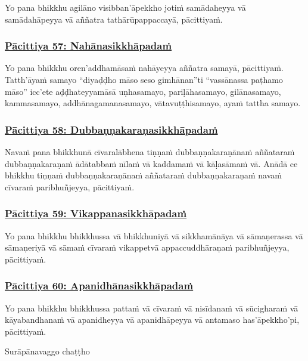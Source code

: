 Yo pana bhikkhu agilāno visibban'āpekkho jotiṁ samādaheyya vā samādahāpeyya vā aññatra tathārūpappaccayā, pācittiyaṁ.

\subsubsection*{\hyperref[exp57]{Pācittiya 57: Nahānasikkhāpadaṁ}}
\label{pac57}

Yo pana bhikkhu oren'addhamāsaṁ nahāyeyya aññatra samayā, pācittiyaṁ. Tatth'āyaṁ samayo “diyaḍḍho māso seso gimhānan''ti “vassānassa paṭhamo māso” icc'ete aḍḍhateyyamāsā uṇhasamayo, pariḷāhasamayo, gilānasamayo, kammasamayo, addhānagamanasamayo, vātavuṭṭhisamayo, ayaṁ tattha samayo.

\subsubsection*{\hyperref[exp58]{Pācittiya 58: Dubbaṇṇakaraṇasikkhāpadaṁ}}
\label{pac58}

Navaṁ pana bhikkhunā cīvaralābhena tiṇṇaṁ dubbaṇṇakaraṇānaṁ aññataraṁ dubbaṇṇakaraṇaṁ ādātabbaṁ nīlaṁ vā kaddamaṁ vā kāḷasāmaṁ vā. Anādā ce bhikkhu tiṇṇaṁ dubbaṇṇakaraṇānaṁ aññataraṁ dubbaṇṇakaraṇaṁ navaṁ cīvaraṁ paribhuñjeyya, pācittiyaṁ.

\subsubsection*{\hyperref[exp59]{Pācittiya 59: Vikappanasikkhāpadaṁ}}
\label{pac59}

Yo pana bhikkhu bhikkhussa vā bhikkhuniyā vā sikkhamānāya vā sāmaṇerassa vā sāmaṇeriyā vā sāmaṁ cīvaraṁ vikappetvā appaccuddhāraṇaṁ paribhuñjeyya, pācittiyaṁ.

\subsubsection*{\hyperref[exp60]{Pācittiya 60: Apanidhānasikkhāpadaṁ}}
\label{pac60}

Yo pana bhikkhu bhikkhussa pattaṁ vā cīvaraṁ vā nisīdanaṁ vā sūcigharaṁ vā kāyabandhanaṁ vā apanidheyya vā apanidhāpeyya vā antamaso has'āpekkho'pi, pācittiyaṁ.

\begin{center}
  Surāpānavaggo chaṭṭho
\end{center}

